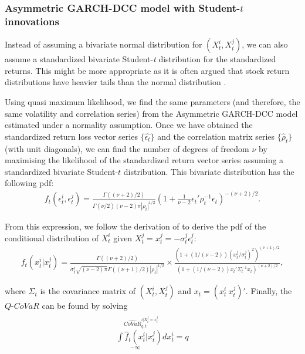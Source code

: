 \documentclass[12pt]{article}
\begin{document}

\subsubsection{Asymmetric GARCH-DCC model with Student-$t$ innovations}


Instead of assuming a bivariate normal distribution for $(X^i_t,X^j_t)$, we can also assume a standardized bivariate Student-\textit{t} distribution for the standardized returns. This might be more appropriate as it is often argued that stock return distributions have heavier tails than the normal distribution \citep[e.g.,][]{bradley}.

Using quasi maximum likelihood, we find the same parameters (and therefore, the same volatility and correlation series) from the Asymmetric GARCH-DCC model estimated under a normality assumption. Once we have obtained the standardized return loss vector series $\{\hat{\epsilon_t}\}$ and the correlation matrix series $\{\hat{\rho}_t\}$ (with unit diagonals), we can find the number of degrees of freedom $\nu$ by maximising the likelihood of the standardized return vector series assuming a standardized bivariate Student-$t$ distribution. This bivariate distribution has the following pdf:
\begin{align}
{f}_t\left({\epsilon}^i_t,{\epsilon}^j_t\right)=\frac{\Gamma\left(\left(\nu+2\right)/2\right)}{\Gamma\left(\nu/2\right)\left(\nu-2\right)\pi\left|{\rho}_{t}\right|^{1/2}}\left(1+\frac{1}{\nu-2}{\epsilon}_t'{\rho}_{t}^{-1}{\epsilon}_t\right)^{-\left(\nu+2\right)/2} .
 \end{align}

\noindent From this expression, we follow the derivation of \citet{multit} to derive the pdf of the conditional distribution of $X^i_t$ given $X^j_t=x^j_t= - {\sigma}^j_t {\epsilon}_{t}^{j} $:
\begin{align}
{f}_t\left(x^i_t\big|x^j_t\right)=
\frac{\Gamma\left(\left(\nu+2\right)/2\right)}
       {{\sigma}^i_t \sqrt{\left(\nu-2\right)\pi}\Gamma\left(\left(\nu+1\right)/2\right)\left|{\rho}_{t}\right|^{1/2}}  \times
\frac{\left(1+\left(1/\left(\nu-2\right)\right)\left(x_{t}^{j}\big/ {\sigma}^j_t \right)^{2}\right)^{\left(\nu+1\right)/2}}
       {\left(1+\left(1/\left(\nu-2\right)\right)x_{t}'{\Sigma}_{t}^{-1}x_{t}\right)^{\left(\nu+2\right)/2}} ,
\end{align}

\noindent where ${\Sigma}_{t}$ is the covariance matrix of $(X^i_t,X^j_t)$ and $x_t=(x^i_t\ x^j_t)'$. Finally, the $Q$-$CoVaR$ can be found by solving
\begin{align}
\begin{split}
\stackrel{\widehat{CoVaR}_{q,t}^{i|X_{t}^{j}= x_{t}^{j}} \ \ \ \ \ \ \ \ \ \ \ \ \ \ \ \ \ \ }
{\underset{-\infty\ \ \ \ \ \ \ \ \ \ \ \ \ \ \ \ \ \ \ \ \ \ \ \ \ \ \ }
{\int \widehat{f}_t\left(x^i_t\big|x^j_t\right)dx^i_t=q}}
\end{split}
\end{align}
\end{document}
